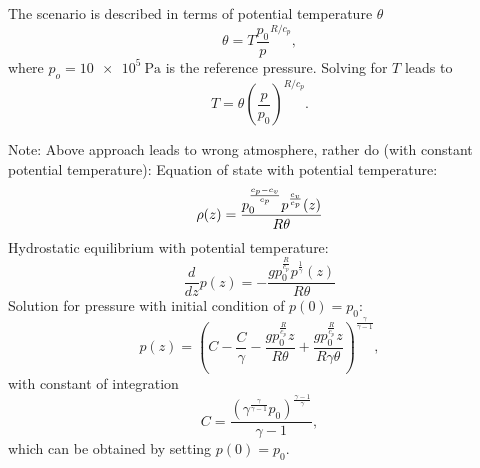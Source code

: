 The scenario is described in terms of potential temperature $\theta$
\begin{equation}
  \theta = T \frac{p_0}{p}^{R/c_p},
\end{equation}
where $p_o = \SI{10e5}{\Pa}$ is the reference pressure.
Solving for $T$ leads to
\begin{equation}
  T = \theta (\frac{p}{p_0})^{R/c_p}.
\end{equation}

Note: Above approach leads to wrong atmosphere, rather do (with constant potential temperature):
Equation of state with potential temperature:
\begin{equation}
  \label{eq:eos}
\rho(z) = \frac{p_{0}^{\frac{c_{p} - c_{v}}{c_{p}}} p^{\frac{c_{v}}{c_{p}}}{\left (z \right )}}{R \theta}
\end{equation}
Hydrostatic equilibrium with potential temperature:
\begin{equation}
  \label{eq:hydrostatic-balance-potT}
  \frac{d}{d z} p{\left (z \right )} = - \frac{g p_{0}^{\frac{R}{c_{p}}} p^{\frac{1}{\gamma}}{\left (z \right )}}{R \theta}
\end{equation}
Solution for pressure with initial condition of $p(0) = p_0$:
\begin{equation}
p(z) =  \left(C - \frac{C}{\gamma} - \frac{g p_{0}^{\frac{R}{c_{p}}} z}{R \theta} + \frac{g p_{0}^{\frac{R}{c_{p}}} z}{R \gamma \theta}\right)^{\frac{\gamma}{\gamma - 1}},
\end{equation}
with constant of integration
\begin{equation}
  \label{eq:hydrostatic-balance-constant}
 C = \frac{\left(\gamma^{\frac{\gamma}{\gamma - 1}} p_{0}\right)^{\frac{\gamma - 1}{\gamma}}}{\gamma - 1},
\end{equation}
which can be obtained by setting $p(0) = p_0$.


